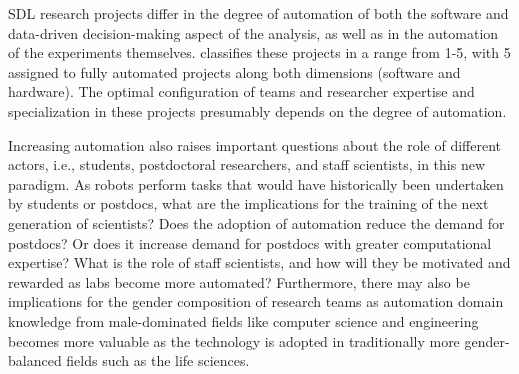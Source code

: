 \documentclass{article}
\begin{document}
SDL research projects differ in the degree of automation of both the software and data-driven decision-making aspect of the analysis, as well as in the automation of the experiments themselves.\cite{sterling2024} classifies these projects in a range from 1-5, with 5 assigned to fully automated projects along both dimensions (software and hardware). The optimal configuration of teams and researcher expertise and specialization in these projects presumably depends on the degree of automation.

Increasing automation also raises important questions about the role of different actors, i.e., students, postdoctoral researchers, and staff scientists, in this new paradigm. As robots perform tasks that would have historically been undertaken by students or postdocs, what are the implications for the training of the next generation of scientists? Does the adoption of automation reduce the demand for postdocs? Or does it increase demand for postdocs with greater computational expertise? What is the role of staff scientists, and how will they be motivated and rewarded as labs become more automated? Furthermore, there may also be implications for the gender composition of research teams as automation domain knowledge from male-dominated fields like computer science and engineering becomes more valuable as the technology is adopted in traditionally more gender-balanced fields such as the life sciences. 



\end{document}
